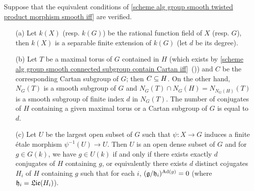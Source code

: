 \begin{corollary}\label{scheme alg group smooth twisted product morphism smooth prop}
Suppose that the equivalent conditions of \cref{scheme alg group smooth twisted product morphism smooth iff} are verified.
\begin{enumerate}
    \item[(a)] Let $k(X)$ (resp. $k(G)$) be the rational function field of $X$ (resp. $G$), then $k(X)$ is a separable finite extension of $k(G)$ (let $d$ be its degree).
    \item[(b)] Let $T$ be a maximal torus of $G$ contained in $H$ (which exists by \cref{scheme alg group smooth connected subgroup contain Cartan iff}~()) and $C$ be the corresponding Cartan subgroup of $G$; then $C\subseteq H$. On the other hand, $N_G(T)$ is a smooth subgroup of $G$ and $N_G(T)\cap N_G(H)=N_{N_G(H)}(T)$ is a smooth subgroup of finite index $d$ in $N_G(T)$. The number of conjugates of $H$ containing a given maximal torus or a Cartan subgroup of $G$ is equal to $d$.
    \item[(c)] Let $U$ be the largest open subset of $G$ such that $\psi:X\to G$ induces a finite \'etale morphism $\psi^{-1}(U)\to U$. Then $U$ is an open dense subset of $G$ and for $g\in G(k)$, we have $g\in U(k)$ if and only if there exists exactly $d$ conjugates of $H$ containing $g$, or equivalently there exists $d$ distinct cojugates $H_i$ of $H$ containing $g$ such that for each $i$, $(\mathfrak{g}/\mathfrak{h}_i)^{\mathrm{Ad}(g)}=0$ (where $\mathfrak{h}_i=\mathfrak{Lie}(H_i)$).
\end{enumerate}
\end{corollary}

